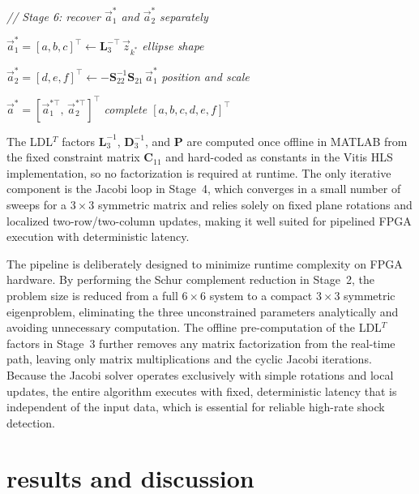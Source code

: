 \documentclass[colorlinks,upint,subscriptcorrection,varvw,hyphenate,balance,greek,russian,vietnamese,german]{asmeconf} %
\newcommand{\vect}[1]{\vec{#1}}
\begin{document}
\begin{algorithm}[h]
\begin{algorithmic}[1]
	\Statex \textit{// Stage 6: recover $\vect{a}_1^*$
		and $\vect{a}_2^*$ separately}
	
	\State $\vect{a}_1^* = [a,b,c]^\top \leftarrow
	\mathbf{L}_3^{-\top}\,\vect{z}_{k^*}$
	\hfill \textit{ellipse shape}
	
	\State $\vect{a}_2^* = [d,e,f]^\top \leftarrow
	-\mathbf{S}_{22}^{-1}
	\mathbf{S}_{21}\,\vect{a}_1^*$
	\hfill \textit{position and scale}
	
	\State \Return
	$\vect{a}^*\!=\!
	[\vect{a}_1^{*\top},\,
	\vect{a}_2^{*\top}]^\top$
	\hfill \textit{complete $[a,b,c,d,e,f]^\top$}
		
	\end{algorithmic}
\end{algorithm}


The LDL$^T$ factors $\mathbf{L}_3^{-1}$, $\mathbf{D}_3^{-1}$, and $\mathbf{P}$ are computed once offline in MATLAB from the fixed constraint matrix $\mathbf{C}_{11}$ and hard-coded as constants in the Vitis HLS implementation, so no factorization is required at runtime. The only iterative component is the Jacobi loop in Stage~4, which converges in a small number of sweeps for a $3\times3$ symmetric matrix and relies solely on fixed plane rotations and localized two-row/two-column updates, making it well suited for pipelined FPGA execution with deterministic latency.

The pipeline is deliberately designed to minimize runtime complexity on FPGA hardware. By performing the Schur complement reduction in Stage~2, the problem size is reduced from a full $6\times6$ system to a compact $3\times3$ symmetric eigenproblem, eliminating the three unconstrained parameters analytically and avoiding unnecessary computation. The offline pre-computation of the LDL$^T$ factors in Stage~3 further removes any matrix factorization from the real-time path, leaving only matrix multiplications and the cyclic Jacobi iterations. Because the Jacobi solver operates exclusively with simple rotations and local updates, the entire algorithm executes with fixed, deterministic latency that is independent of the input data, which is essential for reliable high-rate shock detection.

\section{results and discussion}
\end{document}
